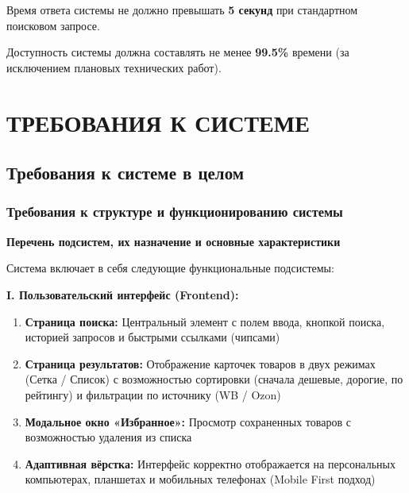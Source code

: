 \documentclass[a4paper,12pt]{article}
\begin{document}
Время ответа системы не должно превышать \textbf{5 секунд} при стандартном поисковом запросе.

Доступность системы должна составлять не менее \textbf{99.5\%} времени (за исключением плановых технических работ).

\newpage
\section{ТРЕБОВАНИЯ К СИСТЕМЕ}

\subsection{Требования к системе в целом}

\subsubsection{Требования к структуре и функционированию системы}

\textbf{Перечень подсистем, их назначение и основные характеристики}

Система включает в себя следующие функциональные подсистемы:

\textbf{I. Пользовательский интерфейс (Frontend):}
\begin{enumerate}
	\item \textbf{Страница поиска:} Центральный элемент с полем ввода, кнопкой поиска, историей запросов и быстрыми ссылками (чипсами)
	\item \textbf{Страница результатов:} Отображение карточек товаров в двух режимах (Сетка / Список) с возможностью сортировки (сначала дешевые, дорогие, по рейтингу) и фильтрации по источнику (WB / Ozon)
	\item \textbf{Модальное окно «Избранное»:} Просмотр сохраненных товаров с возможностью удаления из списка
	\item \textbf{Адаптивная вёрстка:} Интерфейс корректно отображается на персональных компьютерах, планшетах и мобильных телефонах (Mobile First подход)
\end{enumerate}
\end{document}
